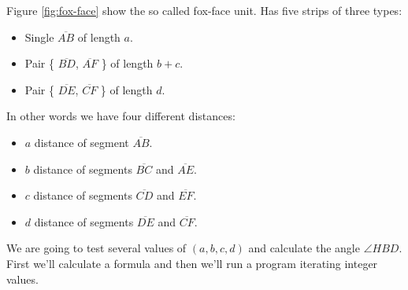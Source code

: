 \documentclass[11pt]{article}
\begin{document}
Figure \ref{fig:fox-face} show the so called fox-face unit.
Has five strips of three types:
\begin{itemize}
\item Single $\overline{AB}$ of length $a$.
\item Pair \{ $\overline{BD}$, $\overline{AF}$ \} of length $b+c$.
\item Pair \{ $\overline{DE}$, $\overline{CF}$ \} of length $d$.
\end{itemize}
In other words we have four different distances:
\begin{itemize}
\item $a$ distance of segment $\overline{AB}$.
\item $b$ distance of segments $\overline{BC}$ and $\overline{AE}$.
\item $c$ distance of segments $\overline{CD}$ and $\overline{EF}$.
\item $d$ distance of segments $\overline{DE}$ and $\overline{CF}$.
\end{itemize}
We are going to test several values of $(a,b,c,d)$ and calculate the angle $\angle{HBD}$.
First we'll calculate a formula and then we'll run a program iterating integer values.
\end{document}
